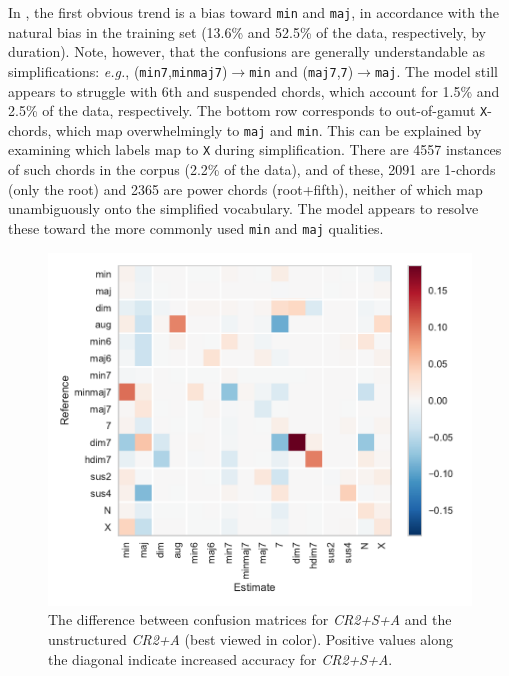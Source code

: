 \documentclass{article}
\def\eg{\emph{e.g.}}
\begin{document}
In , the first obvious trend is a bias toward \texttt{min} and \texttt{maj}, in accordance with the natural bias in the training set (13.6\% and 52.5\% of the data, respectively, by duration).
Note, however, that the confusions are generally understandable as simplifications: \eg, (\texttt{min7},\texttt{minmaj7})$\rightarrow$\texttt{min} and (\texttt{maj7},\texttt{7})$\rightarrow$\texttt{maj}.
The model still appears to struggle with 6th and suspended chords, which account for 1.5\% and 2.5\% of the data, respectively.
The bottom row corresponds to out-of-gamut \texttt{X}-chords, which map overwhelmingly to \texttt{maj} and \texttt{min}.
This can be explained by examining which labels map to \texttt{X} during simplification.
There are 4557 instances of such chords in the corpus (2.2\% of the data), and of these, 2091 are 1-chords (only the root) and 2365 are power chords (root+fifth), neither of which map unambiguously onto the simplified vocabulary.
The model appears to resolve these toward the more commonly used \texttt{min} and \texttt{maj} qualities.

\begin{figure}
    \centering
    \includegraphics[width=\columnwidth]{confdelta}
    \caption{The difference between confusion matrices for \emph{CR2+S+A} and the unstructured \emph{CR2+A} (best viewed in color).
    Positive values along the diagonal indicate increased accuracy for \emph{CR2+S+A}.\label{fig:confdelta}}
\end{figure}
\end{document}
